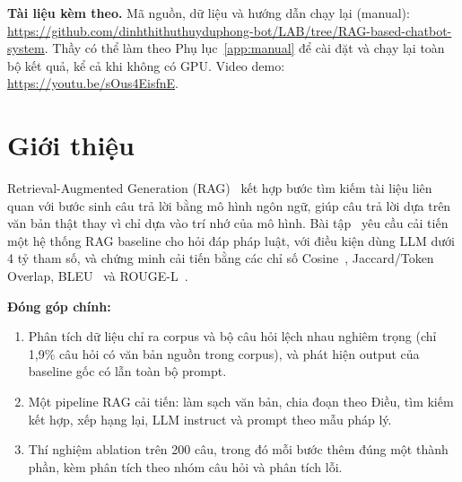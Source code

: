 \documentclass[11pt,a4paper]{article}
\newcommand{\githublink}{https://github.com/dinhthithuthuyduphong-bot/LAB/tree/RAG-based-chatbot-system}
\newcommand{\videolink}{https://youtu.be/sOus4EisfnE}       %
\begin{document}
\noindent\textbf{Tài liệu kèm theo.}
Mã nguồn, dữ liệu và hướng dẫn chạy lại (manual): \url{\githublink}. Thầy có thể làm theo Phụ lục~\ref{app:manual} để cài đặt và chạy lại toàn bộ kết quả, kể cả khi không có GPU.
Video demo: \url{\videolink}.

\tableofcontents
\newpage

\section{Giới thiệu}
Retrieval-Augmented Generation (RAG)~\cite{lewis2020rag} kết hợp bước tìm kiếm tài liệu liên quan với bước sinh câu trả lời bằng mô hình ngôn ngữ,
giúp câu trả lời dựa trên văn bản thật thay vì chỉ dựa vào trí nhớ của mô hình.
Bài tập~\cite{assignment} yêu cầu cải tiến một hệ thống RAG baseline cho hỏi đáp pháp luật, với điều kiện dùng LLM dưới 4 tỷ tham số,
và chứng minh cải tiến bằng các chỉ số Cosine~\cite{manning2008ir}, Jaccard/Token Overlap, BLEU~\cite{papineni2002bleu} và ROUGE-L~\cite{lin2004rouge}.

\textbf{Đóng góp chính:}
\begin{enumerate}
  \item Phân tích dữ liệu chỉ ra corpus và bộ câu hỏi lệch nhau nghiêm trọng (chỉ 1{,}9\% câu hỏi có văn bản nguồn trong corpus),
        và phát hiện output của baseline gốc có lẫn toàn bộ prompt.
  \item Một pipeline RAG cải tiến: làm sạch văn bản, chia đoạn theo Điều, tìm kiếm kết hợp, xếp hạng lại, LLM instruct và prompt theo mẫu pháp lý.
  \item Thí nghiệm ablation trên 200 câu, trong đó mỗi bước thêm đúng một thành phần, kèm phân tích theo nhóm câu hỏi và phân tích lỗi.
\end{enumerate}
\end{document}
